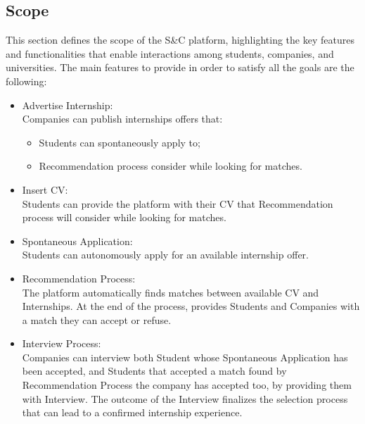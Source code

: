 \subsection{Scope}
This section defines the scope of the S\&C platform, highlighting the key features and functionalities that enable interactions among students, companies, and universities.
The main features to provide in order to satisfy all the goals are the following:
\begin{itemize}
\item {\color{titleColor}Advertise Internship:}\\ Companies can publish internships offers that:
    \begin{itemize}
        \item Students can spontaneously apply to;
        \item Recommendation process consider while looking for matches.
    \end{itemize}
\item {\color{titleColor}Insert CV:}\\ Students can provide the platform with their CV that Recommendation process will consider while looking for matches.
\item {\color{titleColor}Spontaneous Application:}\\ Students can autonomously apply for an available internship offer.
\item {\color{titleColor}Recommendation Process:}\\ The platform automatically finds matches between available CV and Internships. At the end of the process, provides Students and Companies with a match they can accept or refuse.
\item {\color{titleColor}Interview Process:}\\
    Companies can interview both Student whose Spontaneous Application has been accepted, and Students that accepted a match found by Recommendation Process the company has accepted too, by providing them with Interview. The outcome of the Interview finalizes the selection process that can lead to a confirmed internship experience.  

\end{itemize}

